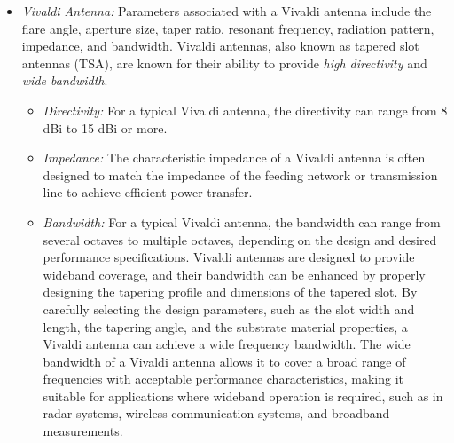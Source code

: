 \documentclass[11pt,a4paper]{article}
\begin{document}
\begin{itemize}
    \item \emph{Vivaldi Antenna:} Parameters associated with a Vivaldi antenna include the flare angle, aperture size, taper ratio, resonant frequency, radiation pattern, impedance, and bandwidth. Vivaldi antennas, also known as tapered slot antennas (TSA), are known for their ability to provide \emph{high directivity} and \emph{wide bandwidth}.
    \begin{itemize}
        \item \emph{Directivity:} For a typical Vivaldi antenna, the directivity can range from 8 dBi to 15 dBi or more.
        \item \emph{Impedance:} The characteristic impedance of a Vivaldi antenna is often designed to match the impedance of the feeding network or transmission line to achieve efficient power transfer.
        \item \emph{Bandwidth:} For a typical Vivaldi antenna, the bandwidth can range from several octaves to multiple octaves, depending on the design and desired performance specifications. Vivaldi antennas are designed to provide wideband coverage, and their bandwidth can be enhanced by properly designing the tapering profile and dimensions of the tapered slot. By carefully selecting the design parameters, such as the slot width and length, the tapering angle, and the substrate material properties, a Vivaldi antenna can achieve a wide frequency bandwidth. The wide bandwidth of a Vivaldi antenna allows it to cover a broad range of frequencies with acceptable performance characteristics, making it suitable for applications where wideband operation is required, such as in radar systems, wireless communication systems, and broadband measurements.
    \end{itemize}
    

\end{itemize}
\end{document}
